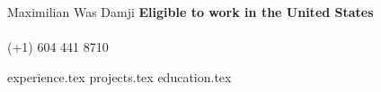 \documentclass[letterpaper,11pt]{article}
\begin{document}
\headinginline
{
    Maximilian Was Damji
}
{
    \textbf{Eligible to work in the United States} \\
     \\
    (+1) 604 441 8710 \\
}

\rule{0pt}{1ex}

{experience.tex}
{projects.tex}
{education.tex}
\end{document}
